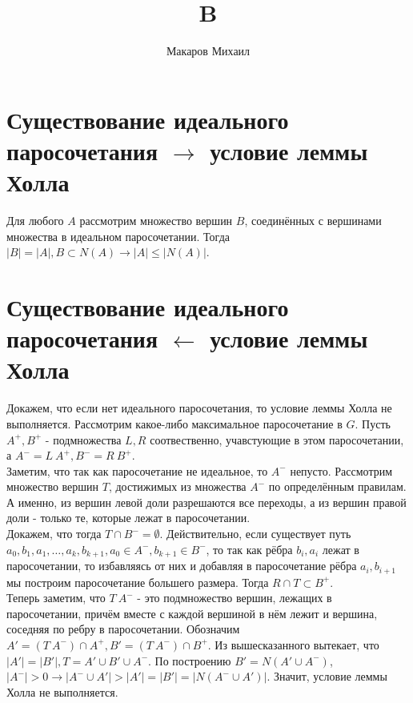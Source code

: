 \documentclass{article}
\title{B}
\author{Макаров Михаил}
\date{}
\begin{document}
	\maketitle
    \section{Существование идеального паросочетания $\rightarrow$ условие леммы Холла}
    Для любого $A$ рассмотрим множество вершин $B$, соединённых с вершинами множества 
    в идеальном паросочетании. Тогда $|B| = |A|, B \subset N(A) \rightarrow |A| \leq |N(A)|$.
    \section{Существование идеального паросочетания $\leftarrow$ условие леммы Холла}
    Докажем, что если нет идеального паросочетания, то условие леммы Холла не выполняется.
    Рассмотрим какое-либо максимальное паросочетание в $G$. Пусть $A^+, B^+$ - подмножества
    $L, R$ соотвественно, учавстующие в этом паросочетании, а $A^- = L \ A^+, B^- = R \ B^+$.\\
    Заметим, что так как паросочетание не идеальное, то $A^-$ непусто. 
    Рассмотрим множество вершин $T$, достижимых из множества $A^-$ по определённым правилам.
    А именно, из вершин левой доли разрешаются все переходы, а из вершин правой доли - только те,
    которые лежат в паросочетании. \\
    Докажем, что тогда $T \cap B^- = \emptyset$. Действительно, если существует путь
    $a_0, b_1, a_1, \ldots, a_k, b_{k + 1}, a_0 \in A^-, b_{k + 1} \in B^-$, то так как
    рёбра $b_i, a_i$ лежат в паросочетании, то избавляясь от них и добавляя в паросочетание
    рёбра $a_i, b_{i+1}$ мы построим паросочетание большего размера. Тогда $R \cap T \subset B^+$. \\
    Теперь заметим, что $ T \ A^- $ - это подмножество вершин,
    лежащих в паросочетании, причём вместе с каждой вершиной в нём лежит и вершина,
    соседняя по ребру в паросочетании. Обозначим $ A' = (T \ A^-) \cap A^+, B' = (T \ A^-) \cap B^+$.
    Из вышесказанного вытекает, что $|A'| = |B'|, T = A' \cup B' \cup A^-$. По построению
    $B' = N(A' \cup A^-)$, $ |A^-| > 0 \rightarrow |A^- \cup A'| > |A'| = |B'| = |N(A^- \cup A')|$.
    Значит, условие леммы Холла не выполняется.
\end{document}
